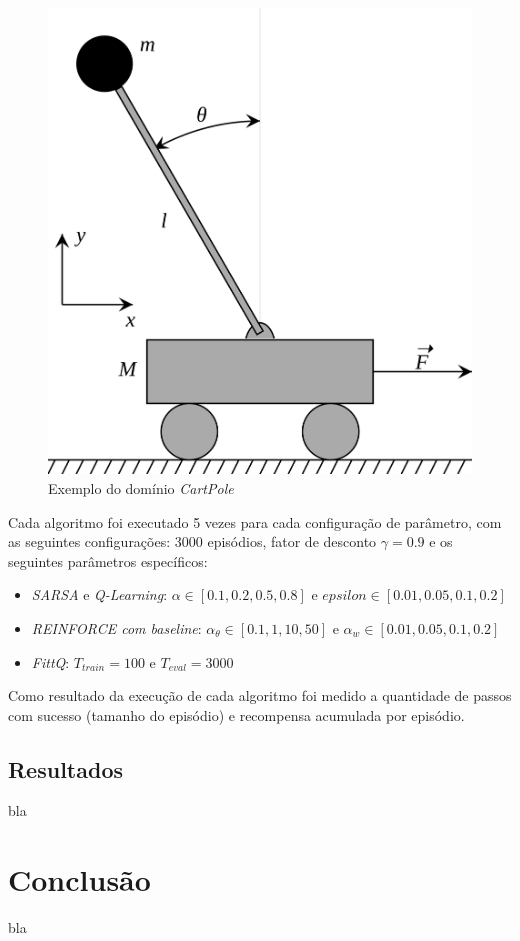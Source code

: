 \documentclass[letterpaper]{article}
\begin{document}
\begin{figure}[t]
  \centering
  \includegraphics[width=0.9\columnwidth]{cart-pole}
  \caption{Exemplo do domínio \textit{CartPole}}
  \label{fig:cart-pole}
\end{figure}

Cada algoritmo foi executado 5 vezes para cada configuração de parâmetro, com as seguintes configurações: 3000 episódios, fator de desconto $\gamma = 0.9$ e os seguintes parâmetros específicos:

\begin{itemize}
  \item \textit{SARSA} e \textit{Q-Learning}: $\alpha \in [ 0.1, 0.2, 0.5, 0.8 ]$ e $epsilon \in [ 0.01, 0.05, 0.1, 0.2 ]$
  \item \textit{REINFORCE com baseline}: $\alpha_{\theta} \in [ 0.1, 1, 10, 50 ]$ e $\alpha_{w} \in [ 0.01, 0.05, 0.1, 0.2 ]$
  \item \textit{FittQ}: $T_{train} = 100$ e $T_{eval} = 3000$
\end{itemize}

Como resultado da execução de cada algoritmo foi medido a quantidade de passos com sucesso (tamanho do episódio) e recompensa acumulada por episódio.

\subsection{Resultados}

bla

\section{Conclusão}

bla



\end{document}
